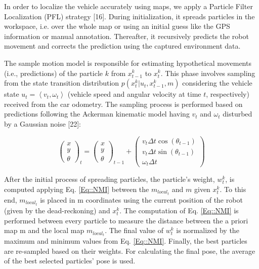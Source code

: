 In order to localize the vehicle accurately using maps, we apply a Particle Filter Localization (PFL) strategy [16]. During initialization, it spreads particles in the workspace, i.e. over the whole map or using an initial guess like the GPS information or manual annotation. Thereafter, it recursively predicts the robot movement and corrects the prediction using the captured environment data.

The sample motion model is responsible for estimating hypothetical movements (i.e., predictions) of the particle $k$ from $x_{t-1}^k$ to $x_t^k$. This phase involves sampling from the state transition distribution $p(x_t^k |u_t,x_{t-1}^k,m)$ considering the vehicle state $u_t=\left\langle v_t,\omega_t\right\rangle$ (vehicle speed and angular velocity at time $t$, respectively) received from the car odometry. The sampling process is performed based on predictions following the Ackerman kinematic model having $v_t$ and $\omega_t$ disturbed by a Gaussian noise [22]:

\begin{equation}
	\label{Eq::Ackeman}
	\left( \begin{array}{c} x\\ y\\ \theta \end{array} \right)_t = 
	\left( \begin{array}{c} x\\ y\\ \theta \end{array} \right)_{t-1} +
	\left( \begin{array}{c} 
	v_t \Delta t \cos(\theta_{t-1})\\ 
	v_t \Delta t \sin(\theta_{t-1})\\ 
	\omega_t \Delta t \end{array} \right)
\end{equation}

After the initial process of spreading particles, the particle's weight, $w_t^k$, is computed applying Eq. \ref{Eq::NMI} between the $m_{{local}_t}$ and $m$ given $x_t^k$. To this end, $m_{{local}_t}$ is placed in m coordinates using the current position of the robot (given by the dead-reckoning) and $x_t^k$. The computation of Eq. \ref{Eq::NMI} is performed between every particle to measure the distance between the a priori map m and the local map $m_{{local}_t}$. The final value of $w_t^k$ is normalized by the maximum and minimum values from Eq. \ref{Eq::NMI}. Finally, the best particles are re-sampled based on their weights. For calculating the final pose, the average of the best selected particles' pose is used.


